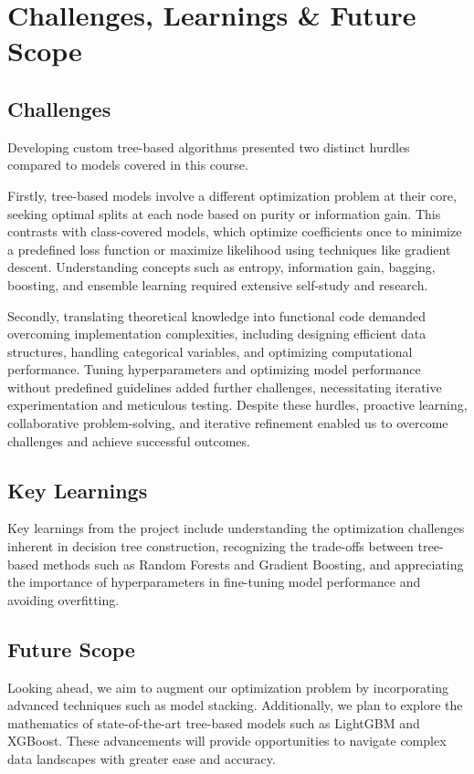 \graphicspath{{images/}}

\section{Challenges, Learnings \& Future Scope}

\subsection{Challenges} 

Developing custom tree-based algorithms presented two distinct hurdles compared to models covered in this course. 

Firstly, tree-based models involve a different optimization problem at their core, seeking optimal splits at each node based on purity or information gain. 
This contrasts with class-covered models, which optimize coefficients once to minimize a predefined loss function or maximize likelihood using techniques like gradient descent. 
Understanding concepts such as entropy, information gain, bagging, boosting, and ensemble learning required extensive self-study and research. 

Secondly, translating theoretical knowledge into functional code demanded overcoming implementation complexities, including designing efficient data structures, handling categorical variables, and optimizing computational performance. 
Tuning hyperparameters and optimizing model performance without predefined guidelines added further challenges, necessitating iterative experimentation and meticulous testing. 
Despite these hurdles, proactive learning, collaborative problem-solving, and iterative refinement enabled us to overcome challenges and achieve successful outcomes.

\subsection{Key Learnings} 

Key learnings from the project include understanding the optimization challenges inherent in decision tree construction, 
recognizing the trade-offs between tree-based methods such as Random Forests and Gradient Boosting, 
and appreciating the importance of hyperparameters in fine-tuning model performance and avoiding overfitting.

\subsection{Future Scope} 
Looking ahead, we aim to augment our optimization problem by incorporating advanced techniques such as model stacking. 
Additionally, we plan to explore the mathematics of state-of-the-art tree-based models such as LightGBM and XGBoost. 
These advancements will provide opportunities to navigate complex data landscapes with greater ease and accuracy.
